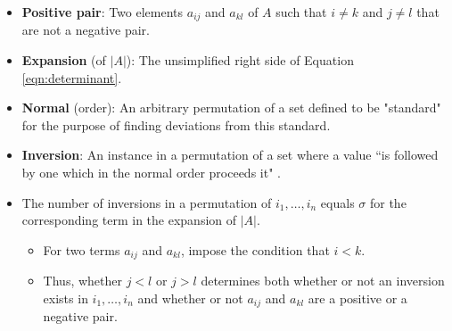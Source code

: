 \documentclass[titlepage]{article}
\numberwithin{figure}{section}
\numberwithin{equation}{section}
\numberwithin{theorem}{section}
\newcommand{\dq}[4][]{``#2"#1 \cite[#4]{#3}.}
\begin{document}
\begin{itemize}
    \item \textbf{Positive pair}: Two elements $a_{ij}$ and $a_{kl}$ of $A$ such that $i\neq k$ and $j\neq l$ that are not a negative pair.
    \item \textbf{Expansion} (of $|A|$): The unsimplified right side of Equation \ref{eqn:determinant}.
    \item \textbf{Normal} (order): An arbitrary permutation of a set defined to be "standard" for the purpose of finding deviations from this standard.
    \item \textbf{Inversion}: An instance in a permutation of a set where a value \dq{is followed by one which in the normal order proceeds it}{bib:determinants}{15}
    \item The number of inversions in a permutation of $i_1,\dots,i_n$ equals $\sigma$ for the corresponding term in the expansion of $|A|$.
    \begin{itemize}
        \item For two terms $a_{ij}$ and $a_{kl}$, impose the condition that $i<k$.
        \item Thus, whether $j<l$ or $j>l$ determines both whether or not an inversion exists in $i_1,\dots,i_n$ and whether or not $a_{ij}$ and $a_{kl}$ are a positive or a negative pair.
    \end{itemize}
\end{itemize}
\end{document}
